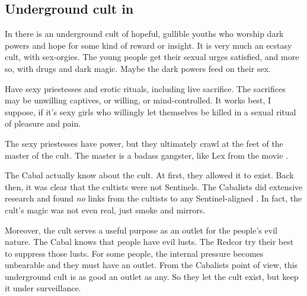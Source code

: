 \subsection{Underground cult in \Redce}
In \Redce{} there is an underground cult of hopeful, gullible youths who worship dark powers and hope for some kind of reward or insight. 
It is very much an ecstasy cult, with sex-orgies. 
The young people get their sexual urges satisfied, and more so, with drugs and dark magic. 
Maybe the dark powers feed on their sex. 

Have sexy priestesses and erotic rituals, including live sacrifice. 
The sacrifices may be unwilling captives, or willing, or mind-controlled. 
It works best, I suppose, if it's sexy girls who willingly let themselves be killed in a sexual ritual of pleasure and pain. 

The sexy priestesses have power, but they ultimately crawl at the feet of the master of the cult. 
The master is a badass gangster, like Lex from the movie \cite{Movie:GargoylesRevenge}. 


The Cabal actually know about the cult. 
At first, they allowed it to exist.
Back then, it was clear that the cultists were not Sentinels.
The Cabalists did extensive research and found \emph{no} links from the cultists to any Sentinel-aligned \matrices. 
In fact, the cult's magic was not even real, just smoke and mirrors. 

Moreover, the cult serves a useful purpose as an outlet for the people's evil nature. 
The Cabal knows that people have evil lusts. 
The Redcor try their best to suppress those lusts. 
For some people, the internal pressure becomes unbearable and they must have an outlet. 
From the Cabalists point of view, this underground cult is as good an outlet as any. 
So they let the cult exist, but keep it under surveillance. 

